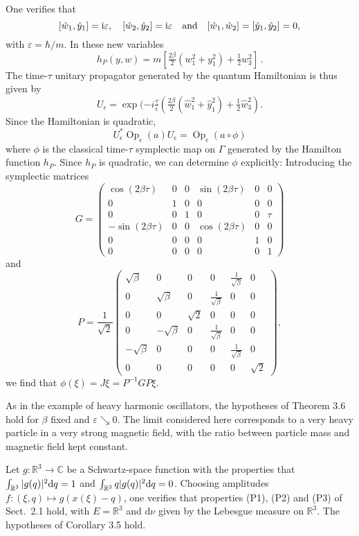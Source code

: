 \documentclass[12pt]{article}
\renewcommand{\d}{{\rm d}}
\renewcommand{\i}{{\rm i}}
\begin{document}
One verifies that
$$[\hat w_1,\hat y_1]=\i\varepsilon,\quad [\hat w_2,\hat y_2]=\i \varepsilon\quad \mbox{and}\quad [\hat w_1,\hat w_2]=[\hat y_1,\hat y_2]=0,$$
with $\varepsilon=\hbar/m$. In these new variables
$$h_P(y,w)=m[\tfrac{2\beta} 2(w_1^2+y_1^2)+\tfrac12w_3^2]\,.$$
The time-$\tau$ unitary propagator generated by the quantum Hamiltonian is thus given by
$$U_\epsilon=\exp(-i \tfrac{\tau}{\epsilon}(\tfrac{2\beta} 2(\hat w_1^2+\hat y_1^2)+\tfrac12\hat w_3^2).$$
Since the Hamiltonian is quadratic, 
$$U_\epsilon^*\operatorname{Op}_{\epsilon}(a)U_\epsilon=\operatorname{Op}_\epsilon(a\circ\phi)$$
where $\phi$ is the classical time-$\tau$ symplectic map on $\Gamma$ generated by the Hamilton function $h_P$. 
Since $h_P$ is quadratic, we can determine $\phi$ explicitly: Introducing the symplectic matrices
$$G=\begin{pmatrix}
	\cos(2\beta\tau)&0&0&\sin(2\beta\tau) & 0&0\\
	0&1&0&0&0&0\\
	0&0&1&0&0&\tau\\
	-\sin(2\beta\tau) &0&0& \cos(2\beta\tau)& 0 &0\\
	0&0&0&0&1&0\\
	0&0&0&0&0&1
\end{pmatrix}
$$
and
$$
P=\frac1{\sqrt{2}}\begin{pmatrix}
\sqrt{\beta}&0&0&0&\frac1{\sqrt{\beta}}&0\\
0&\sqrt{\beta}&0&\frac{1}{\sqrt{\beta}}&0&0\\
0&0&\sqrt{2}&0&0&0\\
0&-\sqrt{\beta}&0&\frac{1}{\sqrt{\beta}}&0&0\\
-\sqrt{\beta}&0&0&0&\frac1{\sqrt{\beta}}&0\\
0&0&0&0&0&\sqrt{2}
\end{pmatrix},$$
we find that $\phi(\xi)=J\xi= P^{-1}GP\xi$.

As in the example of heavy harmonic oscillators, the hypotheses of Theorem 3.6 hold for $\beta$ fixed and 
$\varepsilon\searrow 0$. The limit considered here corresponds to a very heavy particle in a very strong 
magnetic field, with the ratio between particle mass and magnetic field kept constant.

Let $g:\mathbb R^3\to\mathbb C$ be a Schwartz-space function with the properties that $\int_{\mathbb R^3}|g(q)|^2\d q=1$ 
and $\int_{\mathbb R^3}q |g(q)|^2\d q=0$. Choosing amplitudes $f:(\xi,q)\mapsto g(x(\xi)-q)$, one verifies that properties
 (P1), (P2) and (P3) of Sect.~2.1 hold, with $E=\mathbb R^3$ and $\text{d}\nu$ given by the Lebesgue measure on 
 $\mathbb R^3$. The hypotheses of Corollary 3.5 hold.
\end{document}
